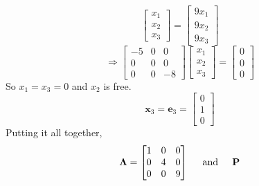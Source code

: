 \begin{enumerate}[label=(\alph*)]
\[\begin{bmatrix}
                    x_1 \\
                    x_2 \\
                    x_3
                \end{bmatrix}
                =
                \begin{bmatrix}
                    9x_1 \\
                    9x_2 \\
                    9x_3
                \end{bmatrix}
            \]
            \[
                \Rightarrow
                \begin{bmatrix}
                    -5 & 0 & 0\\
                    0 & 0 & 0\\
                    0 & 0 & -8
                \end{bmatrix}
                \begin{bmatrix}
                    x_1 \\
                    x_2 \\
                    x_3
                \end{bmatrix}
                =
                \begin{bmatrix}
                    0 \\
                    0 \\
                    0
                \end{bmatrix}
            \]
            So $x_1 = x_3 = 0$ and $x_2$ is free.
            \[
                \mathbf{x}_3
                =
                \mathbf{e}_3
                =
                \begin{bmatrix}
                    0 \\
                    1 \\
                    0
                \end{bmatrix}
            \]
            Putting it all together,
            \[
                \mathbf{\Lambda}
                =
                \begin{bmatrix}
                    1 & 0 & 0 \\
                    0 & 4 & 0 \\
                    0 & 0 & 9
                \end{bmatrix}
                \hspace{0.2in}\text{and}\hspace{0.2in}
                \mathbf{P}
\]
\end{enumerate}
